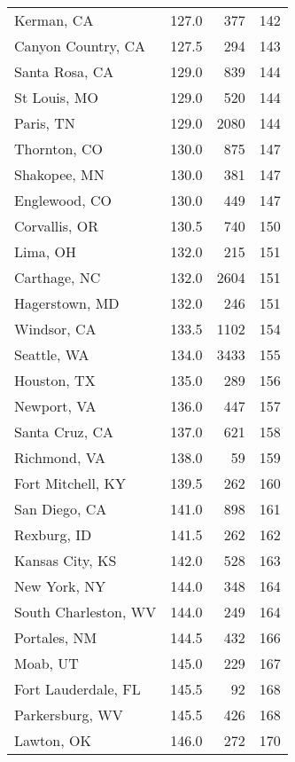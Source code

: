 \begin{longtable}{lrrr}
Kerman, CA           &   127.0 &    377 &   142 \\
Canyon Country, CA   &   127.5 &    294 &   143 \\
Santa Rosa, CA       &   129.0 &    839 &   144 \\
St Louis, MO         &   129.0 &    520 &   144 \\
Paris, TN            &   129.0 &   2080 &   144 \\
Thornton, CO         &   130.0 &    875 &   147 \\
Shakopee, MN         &   130.0 &    381 &   147 \\
Englewood, CO        &   130.0 &    449 &   147 \\
Corvallis, OR        &   130.5 &    740 &   150 \\
Lima, OH             &   132.0 &    215 &   151 \\
Carthage, NC         &   132.0 &   2604 &   151 \\
Hagerstown, MD       &   132.0 &    246 &   151 \\
Windsor, CA          &   133.5 &   1102 &   154 \\
Seattle, WA          &   134.0 &   3433 &   155 \\
Houston, TX          &   135.0 &    289 &   156 \\
Newport, VA          &   136.0 &    447 &   157 \\
Santa Cruz, CA       &   137.0 &    621 &   158 \\
Richmond, VA         &   138.0 &     59 &   159 \\
Fort Mitchell, KY    &   139.5 &    262 &   160 \\
San Diego, CA        &   141.0 &    898 &   161 \\
Rexburg, ID          &   141.5 &    262 &   162 \\
Kansas City, KS      &   142.0 &    528 &   163 \\
New York, NY         &   144.0 &    348 &   164 \\
South Charleston, WV &   144.0 &    249 &   164 \\
Portales, NM         &   144.5 &    432 &   166 \\
Moab, UT             &   145.0 &    229 &   167 \\
Fort Lauderdale, FL  &   145.5 &     92 &   168 \\
Parkersburg, WV      &   145.5 &    426 &   168 \\
Lawton, OK           &   146.0 &    272 &   170 \\

\end{longtable}

